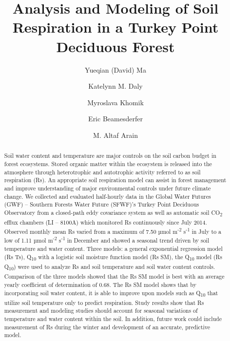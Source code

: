 \documentclass[]{elsarticle} %
\begin{document}
\begin{frontmatter}

  \title{Analysis and Modeling of Soil Respiration in a Turkey Point Deciduous
Forest}
    \author[McMaster University School of Geography and Earth Sciences]{Yueqian (David) Ma}
  
    \author[]{Katelynn M. Daly}
  
  
    \author[]{Myroslava Khomik}
  
    \author[]{Eric Beamesderfer}
  
    \author[]{M. Altaf Arain}
  
      \address[McMaster University]{School of Geography and Earth Sciences, 1280 Main Street West, Hamilton,
Ontario, L8S 4L8}
  
  \begin{abstract}
  Soil water content and temperature are major controls on the soil carbon
  budget in forest ecosystems. Stored organic matter within the ecosystem
  is released into the atmosphere through heterotrophic and autotrophic
  activity referred to as soil respiration (Rs). An appropriate soil
  respiration model can assist in forest management and improve
  understanding of major environmental controls under future climate
  change. We collected and evaluated half-hourly data in the Global Water
  Futures (GWF) -- Southern Forests Water Future (SFWF)'s Turkey Point
  Deciduous Observatory from a closed-path eddy covariance system as well
  as automatic soil CO\textsubscript{2} efflux chambers (LI -- 8100A)
  which monitored Rs continuously since July 2014. Observed monthly mean
  Rs varied from a maximum of 7.50 µmol m\textsuperscript{-2}
  s\textsuperscript{-1} in July to a low of 1.11 µmol
  m\textsuperscript{-2} s\textsuperscript{-1} in December and showed a
  seasonal trend driven by soil temperature and water content. Three
  models: a general exponential regression model (Rs Ts),
  Q\textsubscript{10} with a logistic soil moisture function model (Rs
  SM), the Q\textsubscript{10} model (Rs Q\textsubscript{10}) were used to
  analyze Rs and soil temperature and soil water content controls.
  Comparison of the three models showed that the Rs SM model is best with
  an average yearly coefficient of determination of 0.68. The Rs SM model
  shows that by incorporating soil water content, it is able to improve
  upon models such as Q\textsubscript{10} that utilize soil temperature
  only to predict respiration. Study results show that Rs measurement and
  modeling studies should account for seasonal variations of temperature
  and water content within the soil. In addition, future work could
  include measurement of Rs during the winter and development of an
  accurate, predictive model.
  \end{abstract}
  
 \end{frontmatter}
\end{document}
